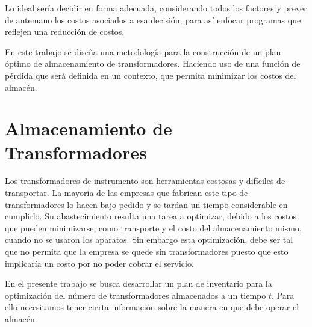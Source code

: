 \noindent Lo ideal ser\'ia decidir en forma adecuada, considerando todos los factores y prever de antemano los costos asociados a esa decisi\'on, para as\'i enfocar programas que reflejen una reducci\'on de costos.

\noindent En este trabajo se dise\~na una metodolog\'ia para la construcci\'on de un plan \'optimo de almacenamiento de transformadores. Haciendo uso de una funci\'on de p\'erdida que ser\'a definida en un contexto, que permita minimizar los costos del almac\'en.


\section{Almacenamiento de Transformadores}

\noindent Los transformadores de instrumento son herramientas costosas y dif\'iciles de transportar. La mayor\'ia de las empresas que fabrican este tipo de transformadores lo hacen bajo pedido y se tardan un tiempo considerable en cumplirlo. Su abastecimiento resulta una tarea a optimizar, debido a los costos que pueden minimizarse, como transporte y el costo del almacenamiento mismo, cuando no se usaron los aparatos. Sin embargo esta optimizaci\'on, debe ser tal que no permita que la empresa se quede sin transformadores puesto que esto implicar\'ia un costo  por no poder cobrar el servicio.

\noindent En el presente trabajo se busca desarrollar un plan de inventario para la optimizaci\'on del n\'umero de transformadores almacenados a un tiempo $t$. Para ello necesitamos tener cierta informaci\'on sobre la manera en que debe operar el almac\'en.

